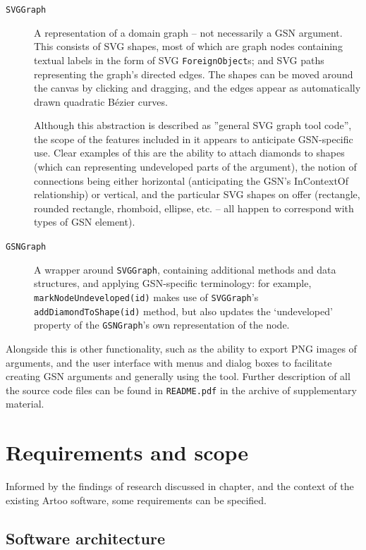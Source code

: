 \begin{description}

\item[{\tt SVGGraph}] A representation of a domain graph -- not necessarily a GSN argument.
This consists of SVG shapes, most of which are graph nodes containing textual labels in the form of SVG {\tt ForeignObject}s; and SVG paths representing the graph's directed edges.
The shapes can be moved around the canvas by clicking and dragging, and the edges appear as automatically drawn quadratic B\'{e}zier curves. 

Although this abstraction is described as ''general SVG graph tool code'', the scope of the features included in it appears to anticipate GSN-specific use. Clear examples of this are the ability to attach diamonds to shapes (which can representing undeveloped parts of the argument), the notion of connections being either horizontal (anticipating the GSN's InContextOf relationship) or vertical, and the particular SVG shapes on offer (rectangle, rounded rectangle, rhomboid, ellipse, etc. -- all happen to correspond with types of GSN element).

\item[{\tt GSNGraph}] A wrapper around {\tt SVGGraph}, containing additional methods and data structures, and applying GSN-specific terminology: for example, {\tt markNodeUndeveloped(id)} makes use of {\tt SVGGraph}'s {\tt addDiamondToShape(id)} method, but also updates the `undeveloped' property of the {\tt GSNGraph}'s own representation of the node.

\end{description}
  
Alongside this is other functionality, such as the ability to export PNG images of arguments, and the user interface with menus and dialog boxes to facilitate creating GSN arguments and generally using the tool. Further description of all the source code files can be found in \texttt{README.pdf} in the archive of supplementary material.

\section{Requirements and scope}

Informed by the findings of research discussed in chapter, and the context of the existing Artoo software, some requirements can be specified.

\subsection{Software architecture}

